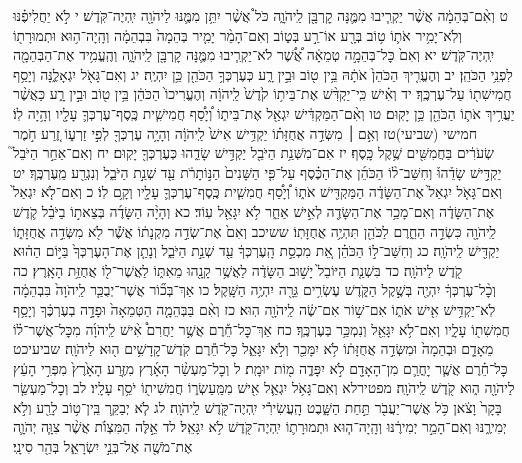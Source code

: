 \documentclass[twoside, openany, parskip=half, 11pt]{book}
\begin{document}
ט וְאִ֨ם־בְּהֵמָ֔ה אֲשֶׁ֨ר יַקְרִ֧יבוּ מִמֶּ֛נָּה קׇרְבָּ֖ן לַֽיהֹוָ֑ה כֹּל֩ אֲשֶׁ֨ר יִתֵּ֥ן מִמֶּ֛נּוּ לַיהֹוָ֖ה יִֽהְיֶה־קֹּֽדֶשׁ׃ י לֹ֣א יַחֲלִיפֶ֗נּוּ וְלֹֽא־יָמִ֥יר אֹת֛וֹ ט֥וֹב בְּרָ֖ע אוֹ־רַ֣ע בְּט֑וֹב וְאִם־הָמֵ֨ר יָמִ֤יר בְּהֵמָה֙ בִּבְהֵמָ֔ה וְהָֽיָה־ה֥וּא וּתְמוּרָת֖וֹ יִֽהְיֶה־קֹּֽדֶשׁ׃ יא וְאִם֙ כׇּל־בְּהֵמָ֣ה טְמֵאָ֔ה אֲ֠שֶׁ֠ר לֹא־יַקְרִ֧יבוּ מִמֶּ֛נָּה קׇרְבָּ֖ן לַֽיהֹוָ֑ה וְהֶֽעֱמִ֥יד אֶת־הַבְּהֵמָ֖ה לִפְנֵ֥י הַכֹּהֵֽן׃ יב וְהֶעֱרִ֤יךְ הַכֹּהֵן֙ אֹתָ֔הּ בֵּ֥ין ט֖וֹב וּבֵ֣ין רָ֑ע כְּעֶרְכְּךָ֥ הַכֹּהֵ֖ן כֵּ֥ן יִהְיֶֽה׃ יג וְאִם־גָּאֹ֖ל יִגְאָלֶ֑נָּה וְיָסַ֥ף חֲמִישִׁת֖וֹ עַל־עֶרְכֶּֽךָ׃ יד וְאִ֗ישׁ כִּֽי־יַקְדִּ֨שׁ אֶת־בֵּית֥וֹ קֹ֙דֶשׁ֙ לַֽיהֹוָ֔ה וְהֶעֱרִיכוֹ֙ הַכֹּהֵ֔ן בֵּ֥ין ט֖וֹב וּבֵ֣ין רָ֑ע כַּאֲשֶׁ֨ר יַעֲרִ֥יךְ אֹת֛וֹ הַכֹּהֵ֖ן כֵּ֥ן יָקֽוּם׃ טו וְאִ֨ם־הַמַּקְדִּ֔ישׁ יִגְאַ֖ל אֶת־בֵּית֑וֹ וְ֠יָסַ֠ף חֲמִישִׁ֧ית כֶּֽסֶף־עֶרְכְּךָ֛ עָלָ֖יו וְהָ֥יָה לֽוֹ׃ חמישי (שביעי)טז וְאִ֣ם ׀ מִשְּׂדֵ֣ה אֲחֻזָּת֗וֹ יַקְדִּ֥ישׁ אִישׁ֙ לַֽיהֹוָ֔ה וְהָיָ֥ה עֶרְכְּךָ֖ לְפִ֣י זַרְע֑וֹ זֶ֚רַע חֹ֣מֶר שְׂעֹרִ֔ים בַּחֲמִשִּׁ֖ים שֶׁ֥קֶל כָּֽסֶף׃ יז אִם־מִשְּׁנַ֥ת הַיֹּבֵ֖ל יַקְדִּ֣ישׁ שָׂדֵ֑הוּ כְּעֶרְכְּךָ֖ יָקֽוּם׃ יח וְאִם־אַחַ֣ר הַיֹּבֵל֮ יַקְדִּ֣ישׁ שָׂדֵ֒הוּ֒ וְחִשַּׁב־ל֨וֹ הַכֹּהֵ֜ן אֶת־הַכֶּ֗סֶף עַל־פִּ֤י הַשָּׁנִים֙ הַנּ֣וֹתָרֹ֔ת עַ֖ד שְׁנַ֣ת הַיֹּבֵ֑ל וְנִגְרַ֖ע מֵֽעֶרְכֶּֽךָ׃ יט וְאִם־גָּאֹ֤ל יִגְאַל֙ אֶת־הַשָּׂדֶ֔ה הַמַּקְדִּ֖ישׁ אֹת֑וֹ וְ֠יָסַ֠ף חֲמִשִׁ֧ית כֶּֽסֶף־עֶרְכְּךָ֛ עָלָ֖יו וְקָ֥ם לֽוֹ׃ כ וְאִם־לֹ֤א יִגְאַל֙ אֶת־הַשָּׂדֶ֔ה וְאִם־מָכַ֥ר אֶת־הַשָּׂדֶ֖ה לְאִ֣ישׁ אַחֵ֑ר לֹ֥א יִגָּאֵ֖ל עֽוֹד׃ כא וְהָיָ֨ה הַשָּׂדֶ֜ה בְּצֵאת֣וֹ בַיֹּבֵ֗ל קֹ֛דֶשׁ לַֽיהֹוָ֖ה כִּשְׂדֵ֣ה הַחֵ֑רֶם לַכֹּהֵ֖ן תִּהְיֶ֥ה אֲחֻזָּתֽוֹ׃ ששיכב וְאִם֙ אֶת־שְׂדֵ֣ה מִקְנָת֔וֹ אֲשֶׁ֕ר לֹ֖א מִשְּׂדֵ֣ה אֲחֻזָּת֑וֹ יַקְדִּ֖ישׁ לַֽיהֹוָֽה׃ כג וְחִשַּׁב־ל֣וֹ הַכֹּהֵ֗ן אֵ֚ת מִכְסַ֣ת הָֽעֶרְכְּךָ֔ עַ֖ד שְׁנַ֣ת הַיֹּבֵ֑ל וְנָתַ֤ן אֶת־הָעֶרְכְּךָ֙ בַּיּ֣וֹם הַה֔וּא קֹ֖דֶשׁ לַיהֹוָֽה׃ כד בִּשְׁנַ֤ת הַיּוֹבֵל֙ יָשׁ֣וּב הַשָּׂדֶ֔ה לַאֲשֶׁ֥ר קָנָ֖הוּ מֵאִתּ֑וֹ לַאֲשֶׁר־ל֖וֹ אֲחֻזַּ֥ת הָאָֽרֶץ׃ כה וְכׇ֨ל־עֶרְכְּךָ֔ יִהְיֶ֖ה בְּשֶׁ֣קֶל הַקֹּ֑דֶשׁ עֶשְׂרִ֥ים גֵּרָ֖ה יִהְיֶ֥ה הַשָּֽׁקֶל׃ כו אַךְ־בְּכ֞וֹר אֲשֶׁר־יְבֻכַּ֤ר לַֽיהֹוָה֙ בִּבְהֵמָ֔ה לֹֽא־יַקְדִּ֥ישׁ אִ֖ישׁ אֹת֑וֹ אִם־שׁ֣וֹר אִם־שֶׂ֔ה לַֽיהֹוָ֖ה הֽוּא׃ כז וְאִ֨ם בַּבְּהֵמָ֤ה הַטְּמֵאָה֙ וּפָדָ֣ה בְעֶרְכֶּ֔ךָ וְיָסַ֥ף חֲמִשִׁת֖וֹ עָלָ֑יו וְאִם־לֹ֥א יִגָּאֵ֖ל וְנִמְכַּ֥ר בְּעֶרְכֶּֽךָ׃ כח אַךְ־כׇּל־חֵ֡רֶם אֲשֶׁ֣ר יַחֲרִם֩ אִ֨ישׁ לַֽיהֹוָ֜ה מִכׇּל־אֲשֶׁר־ל֗וֹ מֵאָדָ֤ם וּבְהֵמָה֙ וּמִשְּׂדֵ֣ה אֲחֻזָּת֔וֹ לֹ֥א יִמָּכֵ֖ר וְלֹ֣א יִגָּאֵ֑ל כׇּל־חֵ֕רֶם קֹֽדֶשׁ־קׇדָשִׁ֥ים ה֖וּא לַיהֹוָֽה׃ שביעיכט כׇּל־חֵ֗רֶם אֲשֶׁ֧ר יׇחֳרַ֛ם מִן־הָאָדָ֖ם לֹ֣א יִפָּדֶ֑ה מ֖וֹת יוּמָֽת׃ ל וְכׇל־מַעְשַׂ֨ר הָאָ֜רֶץ מִזֶּ֤רַע הָאָ֙רֶץ֙ מִפְּרִ֣י הָעֵ֔ץ לַיהֹוָ֖ה ה֑וּא קֹ֖דֶשׁ לַֽיהֹוָֽה׃ מפטירלא וְאִם־גָּאֹ֥ל יִגְאַ֛ל אִ֖ישׁ מִמַּֽעַשְׂר֑וֹ חֲמִשִׁית֖וֹ יֹסֵ֥ף עָלָֽיו׃ לב וְכׇל־מַעְשַׂ֤ר בָּקָר֙ וָצֹ֔אן כֹּ֥ל אֲשֶׁר־יַעֲבֹ֖ר תַּ֣חַת הַשָּׁ֑בֶט הָֽעֲשִׂירִ֕י יִֽהְיֶה־קֹּ֖דֶשׁ לַֽיהֹוָֽה׃ לג לֹ֧א יְבַקֵּ֛ר בֵּֽין־ט֥וֹב לָרַ֖ע וְלֹ֣א יְמִירֶ֑נּוּ וְאִם־הָמֵ֣ר יְמִירֶ֔נּוּ וְהָֽיָה־ה֧וּא וּתְמוּרָת֛וֹ יִֽהְיֶה־קֹּ֖דֶשׁ לֹ֥א יִגָּאֵֽל׃ לד אֵ֣לֶּה הַמִּצְוֺ֗ת אֲשֶׁ֨ר צִוָּ֧ה יְהֹוָ֛ה אֶת־מֹשֶׁ֖ה אֶל־בְּנֵ֣י יִשְׂרָאֵ֑ל בְּהַ֖ר סִינָֽי׃ 
\end{document}
